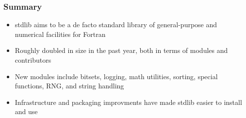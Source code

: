 \documentclass[aspectratio=169]{beamer}
\begin{document}
\begin{frame}
  \frametitle{Summary}

  \begin{itemize}
  \item stdlib aims to be a de facto standard library of general-purpose and numerical facilities for Fortran
  \item Roughly doubled in size in the past year, both in terms of modules and contributors
  \item New modules include bitsets, logging, math utilities, sorting, special functions, RNG, and string handling
  \item Infrastructure and packaging improvments have made stdlib easier to install and use
  \end{itemize}
\end{frame}
\end{document}
